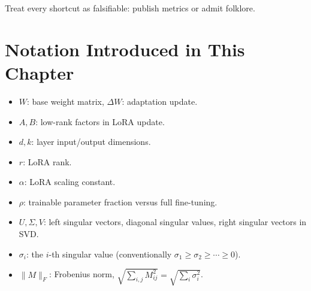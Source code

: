 Treat every shortcut as falsifiable: publish metrics or admit folklore.

\section*{Notation Introduced in This Chapter}
\begin{itemize}[leftmargin=1.5em]
  \item $W$: base weight matrix, $\Delta W$: adaptation update.
  \item $A,B$: low-rank factors in LoRA update.
  \item $d,k$: layer input/output dimensions.
  \item $r$: LoRA rank.
  \item $\alpha$: LoRA scaling constant.
  \item $\rho$: trainable parameter fraction versus full fine-tuning.
  \item $U,\Sigma,V$: left singular vectors, diagonal singular values, right singular vectors in SVD.
  \item $\sigma_i$: the $i$-th singular value (conventionally $\sigma_1 \ge \sigma_2 \ge \cdots \ge 0$).
  \item $\|M\|_F$: Frobenius norm, $\sqrt{\sum_{i,j}M_{ij}^2} = \sqrt{\sum_i \sigma_i^2}$.
\end{itemize}

